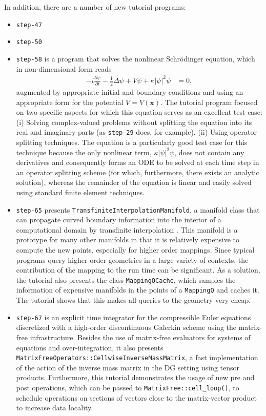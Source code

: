 \documentclass{ansarticle-preprint}
\begin{document}
In addition, there are a number of new tutorial programs:
\begin{itemize}
\item \texttt{step-47}
\item \texttt{step-50}

\item \texttt{step-58} is a program that solves the nonlinear
  Schr{\"o}dinger equation, which in non-dimensional form reads
  \begin{align*}
  - i \frac{\partial \psi}{\partial t}
  - \frac 12 \Delta \psi
  + V \psi
  + \kappa |\psi|^2 \psi
  &= 0,
  \end{align*}
  augmented by appropriate initial and boundary conditions and using
  an appropriate form for the potential $V=V(\mathbf x)$. The
  tutorial program focused on two specific aspects for which this
  equation serves as an excellent test case: (i) Solving
  complex-valued problems without splitting the equation into its
  real and imaginary parts (as \texttt{step-29} does, for
  example). (ii) Using operator splitting techniques. The equation is
  a particularly good test case for this technique because the only
  nonlinear term, $\kappa |\psi|^2 \psi$, does not contain any
  derivatives and consequently forms an ODE to be solved at each time
  step in an operator splitting scheme (for which, furthermore, there
  exists an analytic solution), whereas the remainder of the
  equation is linear and easily solved using standard finite element
  techniques.

\item \texttt{step-65} presents \texttt{TransfiniteInterpolationManifold}, a
manifold class that can propagate curved boundary information into the
interior of a computational domain by transfinite interpolation \cite{Gordon82}.
This manifold is a prototype for many other manifolds in that it is relatively
expensive to compute the new points, especially for higher order mappings. Since
typical programs query higher-order geometries in a large variety of contexts,
the contribution of the mapping to the run time can be significant. As a
solution, the tutorial also presents the class \texttt{MappingQCache}, which
samples the information of expensive manifolds in the points of a
\texttt{MappingQ} and caches it. The tutorial shows that this makes all queries
to the geometry very cheap.

\item \texttt{step-67} is an explicit time integrator for the
compressible Euler equations discretized with a high-order discontinuous
Galerkin scheme using the matrix-free infrastructure. Besides the use of
matrix-free evaluators for systems of equations and over-integration, it also
presents \texttt{MatrixFreeOperators::CellwiseInverseMassMatrix}, a fast implementation
of the action of the inverse mass matrix in the DG setting using tensor
products. Furthermore, this tutorial demonstrates the usage of new
pre and post operations, which can be passed to
\texttt{MatrixFree::cell\_loop()}, to schedule operations on sections of vectors close
to the matrix-vector product to increase data locality.


\end{itemize}
\end{document}
